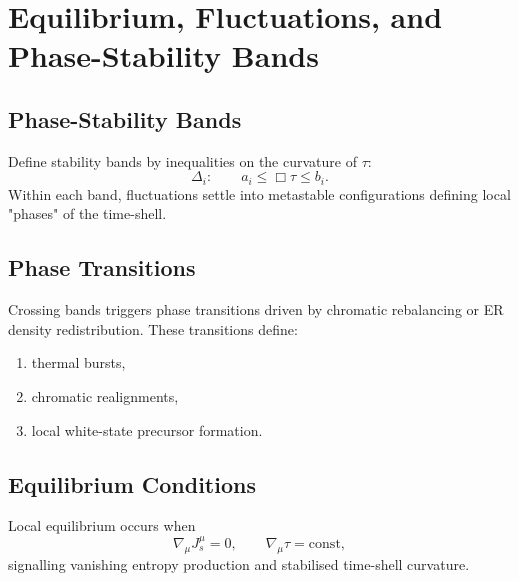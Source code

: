\chapter{Equilibrium, Fluctuations, and Phase-Stability Bands}

\section{Phase-Stability Bands}

Define stability bands by inequalities on the curvature of $\tau$:
\[
\Delta_i: \qquad a_i \le \Box \tau \le b_i.
\]
Within each band, fluctuations settle into metastable configurations defining local "phases" of the time-shell.

\section{Phase Transitions}

Crossing bands triggers phase transitions driven by chromatic rebalancing or ER density redistribution.
These transitions define:
\begin{enumerate}
\item thermal bursts,
\item chromatic realignments,
\item local white-state precursor formation.
\end{enumerate}

\section{Equilibrium Conditions}

Local equilibrium occurs when
\[
\nabla_\mu J^\mu_s = 0,\qquad \nabla_\mu \tau = \mathrm{const},
\]
signalling vanishing entropy production and stabilised time-shell curvature.

